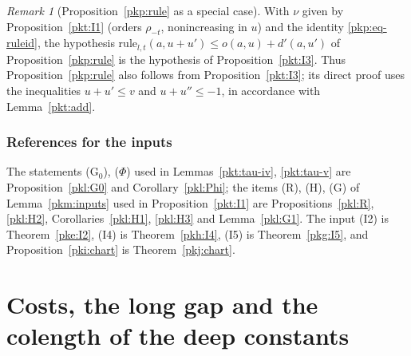 \documentclass[10pt]{amsart}
\theoremstyle{definition}
\theoremstyle{remark}
\newtheorem{remark}[theorem]{Remark}
\newcommand{\Q}{\mathbb Q}
\begin{document}
\begin{remark}[Proposition~\ref{pkp:rule} as a special case]\label{pkt:rem-rule}
With $\nu$ given by Proposition~\ref{pkt:I1} (orders $\rho_{-t}$, nonincreasing in $u$) and the identity
\eqref{pkp:eq-ruleid}, the hypothesis $\mathrm{rule}_{l,t}(a,u+u')\le o(a,u)+d'(a,u')$ of
Proposition~\ref{pkp:rule} is the hypothesis of Proposition~\ref{pkt:I3}. Thus Proposition~\ref{pkp:rule} also follows
from Proposition~\ref{pkt:I3}; its direct proof uses the inequalities $u+u'\le v$ and $u+u''\le-1$, in
accordance with Lemma~\ref{pkt:add}.
\end{remark}

\subsubsection{References for the inputs}\label{pkt:ss-open}

The statements (G$_0$), ($\Phi$) used in Lemmas~\ref{pkt:tau-iv}, \ref{pkt:tau-v} are
Proposition~\ref{pkl:G0} and Corollary~\ref{pkl:Phi}; the items (R), (H), (G) of Lemma~\ref{pkm:inputs}
used in Proposition~\ref{pkt:I1} are Propositions~\ref{pkl:R}, \ref{pkl:H2}, Corollaries~\ref{pkl:H1},
\ref{pkl:H3} and Lemma~\ref{pkl:G1}. The input (I2) is Theorem~\ref{pke:I2}, (I4) is
Theorem~\ref{pkh:I4}, (I5) is Theorem~\ref{pkg:I5}, and Proposition~\ref{pki:chart} is
Theorem~\ref{pkj:chart}.



\section{Costs, the long gap and the colength of the deep constants}\label{C4:g5}
\providecommand{\auO}{\mathcal O}
\providecommand{\auQlb}{\overline{\Q}_\ell}
\providecommand{\panot}[1]{\par\smallskip{\raggedright\noindent\textbf{[Not proved here:} #1\textbf{]}\par}\smallskip}
\providecommand{\pkpA}{A_{\mathrm{inf}}}
\providecommand{\pkpW}{W(C^\flat)}
\providecommand{\pkpAmb}{\mathbb A}
\providecommand{\pknBp}{B^+_{\mathrm{dR}}}
\providecommand{\pknB}{B_{\mathrm{dR}}}
\providecommand{\pknMinf}{\mathfrak M_{\mathrm{inf}}}
\providecommand{\pknK}{\mathcal K_0}
\providecommand{\pkfBp}{B^+}
\providecommand{\pkfSB}{\mathfrak S_B}
\providecommand{\pkcPt}{\mathrm{Pt}}
\providecommand{\pkcimp}{\mathrm{imp}}
\providecommand{\pkeK}[1]{\mathcal K_{#1}}
\providecommand{\pkeAN}{\pkpA\mathcal N}
\providecommand{\pkecost}{\mathrm{cost}}
\providecommand{\pkeDp}{\mathrm{Dp}}
\end{document}
